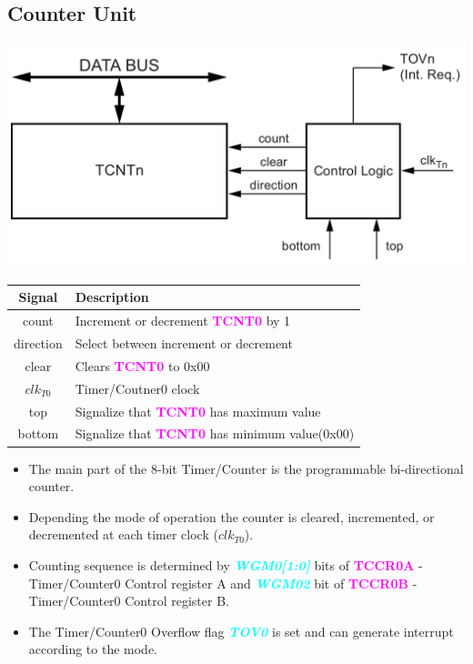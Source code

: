 \documentclass{article}
\newcommand{\bitFormat}[1]{\emph{\textbf{\textcolor{cyan}{#1}}}}
\newcommand{\regFormat}[1]{\textbf{\textcolor{magenta}{#1}}}
\begin{document}
\subsection{Counter Unit}
\begin{minipage}{0.5\textwidth}
    \includegraphics[width=1\textwidth]{Timer0CounterUnit.png}
\end{minipage}
\begin{minipage}{0.45\textwidth}
    \begin{tabular}{c|p{5.5cm}}
        \textbf{Signal} & \textbf{Description}\\
        \hline  
        count & Increment or decrement \regFormat{TCNT0} by 1\\
        direction & Select between increment or decrement\\
        clear & Clears \regFormat{TCNT0} to 0x00\\
        $clk_{T0}$ & Timer/Coutner0 clock\\
        top & Signalize that \regFormat{TCNT0} has maximum value\\
        bottom & Signalize that \regFormat{TCNT0} has minimum value(0x00)\\
    \end{tabular}
\end{minipage}
\begin{itemize}
    \item The main part of the 8-bit Timer/Counter is the programmable bi-directional counter.
    \item Depending the mode of operation the counter is cleared, incremented, or decremented at each timer clock ($clk_{T0}$).
    \item Counting sequence is determined by \bitFormat{WGM0[1:0]} bits of \regFormat{TCCR0A} -Timer/Counter0 Control register A and \bitFormat{WGM02} bit of \regFormat{TCCR0B} - Timer/Counter0 Control register B.
    \item The Timer/Counter0 Overflow flag \bitFormat{TOV0} is set and can generate interrupt according to the mode.
\end{itemize}
\end{document}
